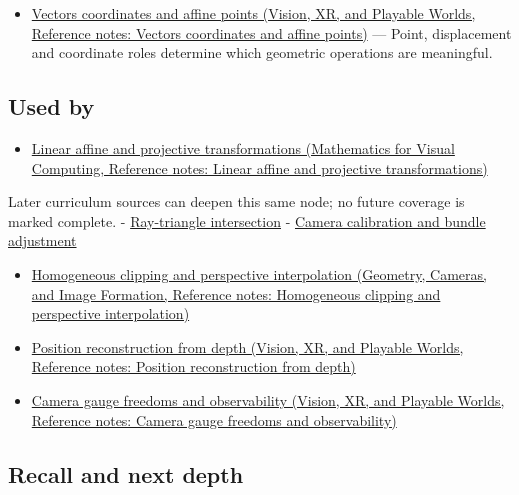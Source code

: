 \begin{itemize}
\tightlist
\item
  \href{../07-Vision-XR-and-Playable-Worlds/main.pdf\#nameddest=appendix-0659864c0aa3}{Vectors coordinates and affine points (Vision, XR, and Playable Worlds, Reference notes: Vectors coordinates and affine points)} --- Point, displacement and coordinate roles determine which geometric operations are meaningful.
\end{itemize}

\subsection{Used by}\label{appendix-cb3b26862282-used-by}

\hypertarget{appendix-cb3b26862282-used-by}{}

\begin{itemize}
\tightlist
\item
  \href{../02-Mathematics-for-Visual-Computing/main.pdf\#nameddest=appendix-0bf0ca73f735}{Linear affine and projective transformations (Mathematics for Visual Computing, Reference notes: Linear affine and projective transformations)}
\end{itemize}

Later curriculum sources can deepen this same node; no future coverage is marked complete. - \hyperref[appendix-47ac1bd6d144]{Ray-triangle intersection} - \hyperref[appendix-3ee9861904d5]{Camera calibration and bundle adjustment}

\begin{itemize}
\tightlist
\item
  \href{../03-Geometry-Cameras-and-Image-Formation/main.pdf\#nameddest=appendix-40426e4b2103}{Homogeneous clipping and perspective interpolation (Geometry, Cameras, and Image Formation, Reference notes: Homogeneous clipping and perspective interpolation)}
\item
  \href{../07-Vision-XR-and-Playable-Worlds/main.pdf\#nameddest=appendix-2cbf2968e866}{Position reconstruction from depth (Vision, XR, and Playable Worlds, Reference notes: Position reconstruction from depth)}
\item
  \href{../07-Vision-XR-and-Playable-Worlds/main.pdf\#nameddest=appendix-113f0267e5f4}{Camera gauge freedoms and observability (Vision, XR, and Playable Worlds, Reference notes: Camera gauge freedoms and observability)}
\end{itemize}

\subsection{Recall and next depth}\label{appendix-cb3b26862282-recall-and-next-depth}

